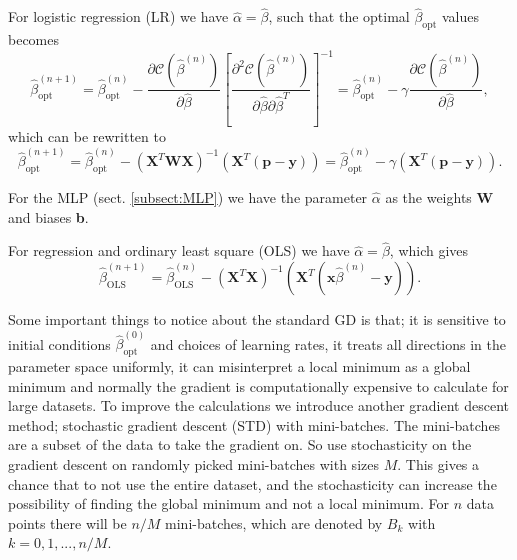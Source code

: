 \documentclass[12pt,a4paper,english]{article}
\begin{document}
For logistic regression (LR) we have $\hat{\alpha}=\hat{\beta}$, such that the optimal $\hat{\beta}_{\text{opt}}$ values becomes
\begin{equation}
\label{eq:GD}
\hat{\beta}_{\text{opt}}^{(n+1)}=\hat{\beta}_{\text{opt}}^{(n)}-\frac{\partial \mathcal{C}(\hat{\beta}^{(n)})}{\partial \hat{\beta}}\left[\frac{\partial^2 \mathcal{C}(\hat{\beta}^{(n)})}{\partial \hat{\beta}\partial \hat{\beta}^T}\right]^{-1}=\hat{\beta}^{(n)}_{\text{opt}}-\gamma\frac{\partial \mathcal{C}(\hat{\beta}^{(n)})}{\partial \hat{\beta}},
\end{equation}
which can be rewritten to
\begin{equation}
\label{eq:GD_opt}
\hat{\beta}_{\text{opt}}^{(n+1)}=\hat{\beta}_{\text{opt}}^{(n)}-(\textbf{X}^T\textbf{W}\textbf{X})^{-1}(\textbf{X}^T(\textbf{p}-\textbf{y}))=\hat{\beta}_{\text{opt}}^{(n)}-\gamma(\textbf{X}^T(\textbf{p}-\textbf{y})).
\end{equation}

For the MLP (sect. \ref{subsect:MLP}) we have the parameter $\hat{\alpha}$ as the weights \textbf{W} and biases \textbf{b}.

For regression and ordinary least square (OLS) we have $\hat{\alpha}=\hat{\beta}$, which gives
\begin{equation}
\label{eq:GD_OLS}
\hat{\beta}_{\text{OLS}}^{(n+1)}=\hat{\beta}_{\text{OLS}}^{(n)}-(\textbf{X}^T\textbf{X})^{-1}(\textbf{X}^T(\textbf{x}\hat{\beta}^{(n)}-\textbf{y})).
\end{equation}

Some important things to notice about the standard GD is that; it is sensitive to initial conditions $\hat{\beta}^{(0)}_{\text{opt}}$ and choices of learning rates, it treats all directions in the parameter space uniformly, it can misinterpret a local minimum as a global minimum and normally the gradient is computationally expensive to calculate for large datasets. To improve the calculations we introduce another gradient descent method; stochastic gradient descent (STD) with mini-batches. The mini-batches are a subset of the data to take the gradient on. So use stochasticity on the gradient descent on randomly picked mini-batches with sizes $M$. This gives a chance that to not use the entire dataset, and the stochasticity can increase the possibility of finding the global minimum and not a local minimum. For $n$ data points there will be $n/M$ mini-batches, which are denoted by $B_k$ with $k=0,1,...,n/M$.
\end{document}
